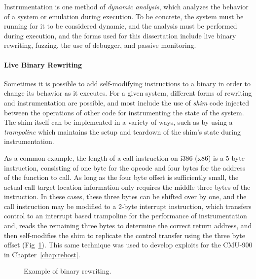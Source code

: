 Instrumentation is one method of \emph{dynamic analysis}, which analyzes the behavior of a system or emulation during execution.
To be concrete, the system must be running for it to be considered dynamic, and the analysis must be performed during execution, and the forms used for this dissertation include live binary rewriting, fuzzing, the use of debugger, and passive monitoring.

\paragraph{Live Binary Rewriting} Sometimes it is possible to add self-modifying instructions to a binary in order to change its behavior as it executes.
For a given system, different forms of rewriting and instrumentation are possible, and most include the use of \emph{shim} code injected between the operations of other code for instrumenting the state of the system.
The shim itself can be implemented in a variety of ways, such as by using a \emph{trampoline} which maintains the setup and teardown of the shim's state during instrumentation.

As a common example, the length of a call instruction on i386 (x86) is a 5-byte instruction, consisting of one byte for the opcode and four bytes for the address of the function to call.
As long as the four byte offset is sufficiently small, the actual call target location information only requires the middle three bytes of the instruction.
In these cases, these three bytes can be shifted over by one, and the call instruction may be modified to a 2-byte interrupt instruction, which transfers control to an interrupt based trampoline for the performance of instrumentation and, reads the remaining three bytes to determine the correct return address, and then self-modifies the shim to replicate the control transfer using the three byte offset (Fig~\ref{fig:livebinaryrewriting}).
This same technique was used to develop exploits for the CMU-900 in Chapter~\ref{chap:rehost}.

\begin{figure}[h]
\centering
{}
\caption{Example of binary rewriting.}
\label{fig:livebinaryrewriting}
\end{figure}

